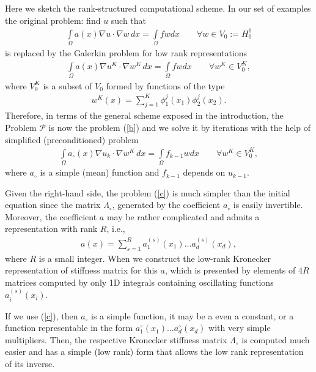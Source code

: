 \documentclass[amstex,amstext,amsfonts,epsf,12pt] {amsart}
\newcommand{\cn}{\color{black}}
\newcommand\be{\begin{eqnarray*}}
\newcommand\ee{\end{eqnarray*}}
\newcommand\ben{\begin{eqnarray}}
\newcommand\een{\end{eqnarray}}
\def\be{\begin{eqnarray*}}
\def\ee{\end{eqnarray*}}
\def\ben{\begin{eqnarray}}
\def\een{\end{eqnarray}}
\def\IntO{\int\limits_\Omega}
\begin{document}
Here we sketch the rank-structured computational scheme.
In our set of examples the original problem: find $u$ such that
\ben
\label{a}
\IntO a(x) \nabla u\cdot \nabla w\,dx=\IntO f w dx\qquad\forall w\in V_0:=H^1_0
\een
is replaced by the Galerkin problem for low rank representations
\ben
\label{b}
\IntO a(x) \nabla u^K\cdot \nabla w^K\,dx=\IntO f w dx\qquad\forall w^K\in V^K_0,
\een
where $V^K_0$ is a subset of $V_0$ formed by functions of the type
\be
w^K(x)=\sum^K_{j=1} \phi^j_1(x_1) \phi^j_2(x_2).
\ee
Therefore, in terms of the general scheme exposed in the introduction, the
Problem $\mathcal P$ is now the problem (\ref{b}) and we solve it by iterations with the help of
simplified (preconditioned) problem
\ben
\label{c}
\IntO a_\circ(x) \nabla u_k\cdot \nabla w^K\,dx=\IntO  f_{k-1} w dx\qquad\forall w^K\in V^K_0,
\een
where $a_\circ$ is a simple (mean) function and $f_{k-1}$ depends on $u_{k-1}$.

% 
Given the right-hand side, the problem (\ref{c}) is much simpler than the initial equation since
the matrix $\Lambda_\circ$, generated by the coefficient $a_\circ$ is easily invertible.
Moreover, 
the coefficient $a$ may be rather complicated and admits a representation with rank $R$, i.e.,
\be
a(x)=\sum^R_{s=1} a^{(s)}_1(x_1)...a^{(s)}_d(x_d),
\ee
where $R$ is a small integer.
When we construct the low-rank Kronecker representation of stiffness
matrix for this $a$, which is presented by  elements of $4R$ matrices
computed by only 1D integrals containing oscillating functions
$a^{(s)}_i(x_i)$. 


If we use (\ref{c}), then $a_\circ$
is a simple function, it may be a even a constant, or
a function representable in the form $a^{\circ}_1(x_1)...a^{\circ}_d(x_d)$ 
with very simple multipliers.
Then, the respective Kronecker stiffness matrix $\Lambda_\circ$ is computed
much easier and has a simple (low rank) form that allows the low rank
representation of its inverse.

\end{document}
